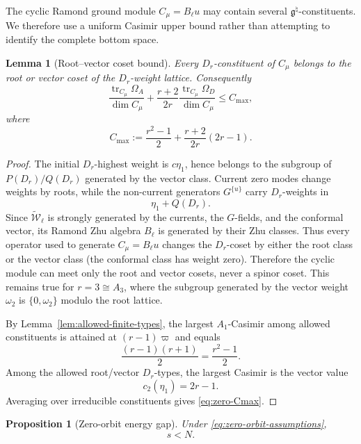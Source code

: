 \documentclass[11pt]{amsart}
\newtheorem{proposition}[theorem]{Proposition}
\newtheorem{lemma}[theorem]{Lemma}
\theoremstyle{remark}
\numberwithin{equation}{section}
\begin{document}
The cyclic Ramond ground module \(C_\mu=B_\ell u\) may contain several
\(\mathfrak g^\natural\)-constituents.  We therefore use a uniform Casimir
upper bound rather than attempting to identify the complete bottom space.

\begin{lemma}[Root--vector coset bound]
\label{lem:zero-root-vector-bound}
Every \(D_r\)-constituent of \(C_\mu\) belongs to the root or vector coset of
the \(D_r\)-weight lattice.  Consequently
\begin{equation}
\label{eq:zero-Cmax}
   \frac{\operatorname{tr}_{C_\mu}\Omega_A}{\dim C_\mu}
   +
   \frac{r+2}{2r}
   \frac{\operatorname{tr}_{C_\mu}\Omega_D}{\dim C_\mu}
   \le
   C_{\max},
\end{equation}
where
\begin{equation}
\label{eq:Cmax-definition}
   C_{\max}
   :=
   \frac{r^2-1}{2}
   +
   \frac{r+2}{2r}(2r-1).
\end{equation}
\end{lemma}

\begin{proof}
The initial \(D_r\)-highest weight is \(c\eta_1\), hence belongs to the
subgroup of \(P(D_r)/Q(D_r)\) generated by the vector class.  Current
zero modes change weights by roots, while the non-current generators
\(G^{\{u\}}\) carry \(D_r\)-weights in
\[
   \eta_1+Q(D_r).
\]
Since \(\widetilde{\mathcal W}_\ell\) is strongly generated by the currents,
the \(G\)-fields, and the conformal vector, its Ramond Zhu algebra
\(B_\ell\) is generated by their Zhu classes.  Thus every operator used to
generate \(C_\mu=B_\ell u\) changes the \(D_r\)-coset by either the root
class or the vector class (the conformal class has weight zero).
Therefore the cyclic module can meet only the root and vector cosets, never
a spinor coset.  This remains true for \(r=3\cong A_3\), where the subgroup
generated by the vector weight \(\omega_2\) is
\(\{0,\omega_2\}\) modulo the root lattice.

By Lemma~\ref{lem:allowed-finite-types}, the largest \(A_1\)-Casimir among
allowed constituents is attained at \((r-1)\varpi\) and equals
\[
   \frac{(r-1)(r+1)}2
   =
   \frac{r^2-1}{2}.
\]
Among the allowed root/vector \(D_r\)-types, the largest Casimir is the
vector value
\[
   c_2(\eta_1)=2r-1.
\]
Averaging over irreducible constituents gives \eqref{eq:zero-Cmax}.
\end{proof}

\begin{proposition}[Zero-orbit energy gap]
Under \eqref{eq:zero-orbit-assumptions},
\begin{equation}
   s<N.
\end{equation}
\end{proposition}
\end{document}
